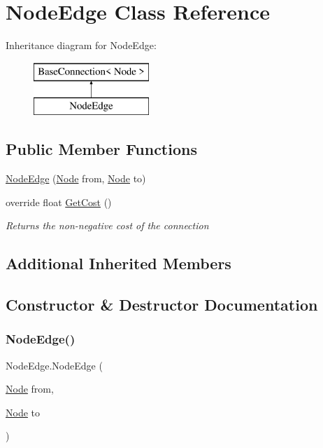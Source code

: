 \hypertarget{class_node_edge}{}\section{Node\+Edge Class Reference}
\label{class_node_edge}
Inheritance diagram for Node\+Edge\+:\begin{figure}[H]
\begin{center}
\leavevmode
\includegraphics[height=2.000000cm]{class_node_edge}
\end{center}
\end{figure}
\subsection*{Public Member Functions}
\begin{DoxyCompactItemize}
\item 
\mbox{\hyperlink{class_node_edge_ae99d0852e1477a08c220aadde2a800ff}{Node\+Edge}} (\mbox{\hyperlink{class_node}{Node}} from, \mbox{\hyperlink{class_node}{Node}} to)
\item 
override float \mbox{\hyperlink{class_node_edge_aa2eb53bd74c21ecc54af55568af1b6cc}{Get\+Cost}} ()
\begin{DoxyCompactList}\small\item\em Returns the non-\/negative cost of the connection \end{DoxyCompactList}\end{DoxyCompactItemize}
\subsection*{Additional Inherited Members}


\subsection{Constructor \& Destructor Documentation}
\mbox{\label{class_node_edge_ae99d0852e1477a08c220aadde2a800ff}} 
\subsubsection{\texorpdfstring{Node\+Edge()}{NodeEdge()}}
{\footnotesize\ttfamily Node\+Edge.\+Node\+Edge (\begin{DoxyParamCaption}\item[{\mbox{\hyperlink{class_node}{Node}}}]{from,  }\item[{\mbox{\hyperlink{class_node}{Node}}}]{to }\end{DoxyParamCaption})}



